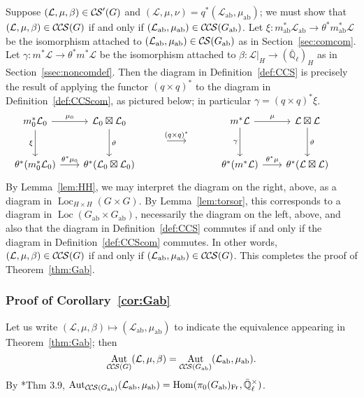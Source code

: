 \documentclass[10pt]{amsart}
\theoremstyle{plain}
\theoremstyle{definition}
\newcommand{\EE}{\mathbb{\bar Q}_\ell}
\newcommand{\EEx}{\EE^\times}
\newcommand{\Frob}[1]{\operatorname{Fr}_{#1}}
\DeclareMathOperator{\Aut}{Aut}
\DeclareMathOperator{\Hom}{Hom}
\DeclareMathOperator{\Loc}{Loc}
\newcommand{\ab}{_{\operatorname{ab}}}
\newcommand{\cs}[1]{{\mathcal{#1}}}
\newcommand{\CS}{{\mathcal{C\hskip-0.8pt S}}}
\newcommand{\CCS}{{\mathcal{C\hskip-.8pt C\hskip-0.8pt S}}}
\begin{document}
Suppose $(\cs{L},\mu,\beta)\in \CS'(G)$ and $(\cs{L},\mu,\nu) = q^*(\cs{L}\ab,\mu\ab)$;
we must show that $(\cs{L},\mu,\beta)\in \CCS(G)$ if and only if $(\cs{L}\ab,\mu\ab)\in \CCS(G\ab)$.
Let $\xi : m\ab^*\cs{L}\ab \to \theta^* m\ab^*\cs{L}$ be the isomorphism attached to $(\cs{L}\ab,\mu\ab)\in \CS(G\ab)$ as in Section~\ref{sec:comcom}.
Let $\gamma : m^*\cs{L} \to \theta^* m^*\cs{L}$ be the isomorphism attached to $\beta : \cs{L}\vert_{H} \to (\EE)_{H}$ as in Section~\ref{ssec:noncomdef}.
Then the diagram in Definition~\ref{def:CCS} is precisely the result of applying the functor $(q\times q)^*$ to the diagram in Definition~\ref{def:CCScom}, as pictured below; 
in particular $\gamma = (q\times q)^* \xi$.
  \[
  \begin{tikzcd}[row sep=10, column sep = 20]
   m_0^*\cs{L}_0 \arrow{dd}[swap]{\xi} \arrow{r}{\mu_0} 
   & \cs{L}_0\boxtimes\cs{L}_0 \arrow{dd}{\vartheta}
&&&   m^*\cs{L} \arrow{dd}[swap]{\gamma} \arrow{r}{\mu} 
 & \cs{L}\boxtimes\cs{L} \arrow{dd}{\vartheta}\\
 && \arrow{r}{(q\times q)^*}  &\ & & &\\ 
   \theta^*(m_0^*\cs{L}_0) \arrow{r}{{\theta}^*\mu_0} 
 &  \theta^*(\cs{L}_0\boxtimes\cs{L}_0)
&&&   \theta^*(m^*\cs{L}) \arrow{r}{{\theta}^*\mu} 
&  \theta^*(\cs{L}\boxtimes\cs{L})
  \end{tikzcd}
\]
By Lemma~\ref{lem:HH}, we may interpret the diagram on the right, above, as a diagram in $\Loc_{H\times H}(G\times G)$.
By Lemma~\ref{lem:torsor}, this corresponds to a diagram in $\Loc(G\ab\times G\ab)$, necessarily the diagram on the left, above, and also that the diagram in Definition~\ref{def:CCS} commutes if and only if the diagram in Definition~\ref{def:CCScom} commutes. 
In other words, $(\cs{L},\mu,\beta)\in \CCS(G)$
if and only if $(\cs{L}\ab,\mu\ab)\in \CCS(G)$.
This completes the proof of Theorem~\ref{thm:Gab}.

\subsubsection{Proof of Corollary~\ref{cor:Gab}}\label{ssec:proof3}

Let us write $(\cs{L},\mu,\beta) \mapsto (\cs{L}\ab,\mu\ab)$ to indicate the equivalence appearing in Theorem~\ref{thm:Gab};
then \[\Aut_{\CCS(G)}(\cs{L},\mu,\beta) = \Aut_{\CCS(G\ab)}(\cs{L}\ab,\mu\ab).\] 
By \cite{cunningham-roe:13a}*{Thm 3.9},  $\Aut_{\CCS(G\ab)}(\cs{L}\ab,\mu\ab) = \Hom(\pi_0(G\ab)_{\Frob{}},\EEx)$.
\end{document}
